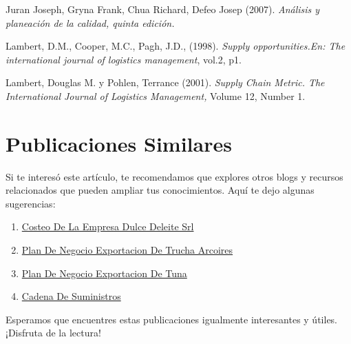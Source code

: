 \documentclass[
  jou,
  floatsintext,
  longtable,
  a4paper,
  nolmodern,
  notxfonts,
  notimes,
  12pt,
  colorlinks=true,linkcolor=blue,citecolor=blue,urlcolor=blue]{apa7}
\providecommand{\tightlist}{%
  \setlength{\itemsep}{0pt}\setlength{\parskip}{0pt}}
\begin{document}
Juran Joseph, Gryna Frank, Chua Richard, Defeo Josep (2007).
\emph{Análisis y planeación de la calidad, quinta edición.}

Lambert, D.M., Cooper, M.C., Pagh, J.D., (1998). \emph{Supply
opportunities.En: The international journal of logistics management},
vol.2, p1.

Lambert, Douglas M. y Pohlen, Terrance (2001). \emph{Supply Chain
Metric. The International Journal of Logistics Management,} Volume 12,
Number 1.

\section{Publicaciones Similares}\label{publicaciones-similares}

Si te interesó este artículo, te recomendamos que explores otros blogs y
recursos relacionados que pueden ampliar tus conocimientos. Aquí te dejo
algunas sugerencias:

\begin{enumerate}
\def\labelenumi{\arabic{enumi}.}
\tightlist
\item
  \href{https://actus-mercator.netlify.app/posts/2017-10-23-costeo-de-la-empresa-dulce-deleite-srl/index.pdf}{}
  \href{https://actus-mercator.netlify.app/posts/2017-10-23-costeo-de-la-empresa-dulce-deleite-srl}{Costeo
  De La Empresa Dulce Deleite Srl}
\item
  \href{https://actus-mercator.netlify.app/posts/2020-09-15-plan-de-negocio-exportacion-de-trucha-arcoires/index.pdf}{}
  \href{https://actus-mercator.netlify.app/posts/2020-09-15-plan-de-negocio-exportacion-de-trucha-arcoires}{Plan
  De Negocio Exportacion De Trucha Arcoires}
\item
  \href{https://actus-mercator.netlify.app/posts/2021-07-13-plan-de-negocio-exportacion-de-tuna/index.pdf}{}
  \href{https://actus-mercator.netlify.app/posts/2021-07-13-plan-de-negocio-exportacion-de-tuna}{Plan
  De Negocio Exportacion De Tuna}
\item
  \href{https://actus-mercator.netlify.app/posts/2022-01-23-cadena-de-suministros/index.pdf}{}
  \href{https://actus-mercator.netlify.app/posts/2022-01-23-cadena-de-suministros}{Cadena
  De Suministros}
\end{enumerate}

Esperamos que encuentres estas publicaciones igualmente interesantes y
útiles. ¡Disfruta de la lectura!
\end{document}
